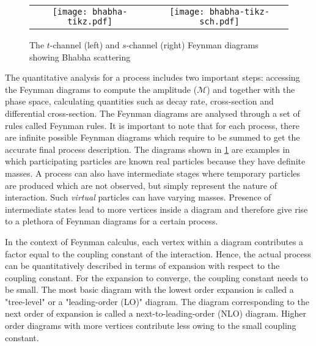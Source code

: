 \begin{figure}[htbp]
    \centering
    \begin{tabular}{cc}
        \texttt{[image: bhabha-tikz.pdf]} &
        \texttt{[image: bhabha-tikz-sch.pdf]} \\[1ex]
    \end{tabular}
    \caption{The $t$-channel (left) and $s$-channel (right) Feynman diagrams showing Bhabha scattering }
    \label{fig:bhabha}
\end{figure}


The quantitative analysis for a process includes two important steps: accessing the Feynman diagrams to
compute the amplitude ($\mathcal{M}$) and together with the phase space, calculating quantities such as 
decay rate, cross-section and differential cross-section. The Feynman diagrams are 
analysed through a set of rules called Feynman rules. It is important to note that
for each process, there are infinite possible Feynman diagrams which require to be summed to get the 
accurate final process description. The diagrams shown in \cref{fig:bhabha} 
are examples in which participating particles are known real particles because they 
have definite masses. A
process can also have intermediate stages where temporary particles are produced which are not
observed, but simply represent the nature of interaction. Such \textit{virtual} particles can have varying masses.
Presence of intermediate states lead to 
more vertices inside a diagram and therefore give rise to a plethora of Feynman diagrams for a certain 
process. 

In the context of Feynman calculus, each vertex within a diagram contributes a factor equal to the 
coupling constant of the interaction. Hence, the actual process can be quantitatively described in terms
of expansion with respect to the coupling constant. For the expansion to converge, the coupling constant
needs to be small. The most basic diagram with the lowest order expansion
is called a "tree-level" or a "leading-order (LO)" diagram. The diagram corresponding to the next order
of expansion is called a next-to-leading-order (NLO) diagram. Higher order diagrams with more vertices 
contribute less owing to the small coupling constant. 


